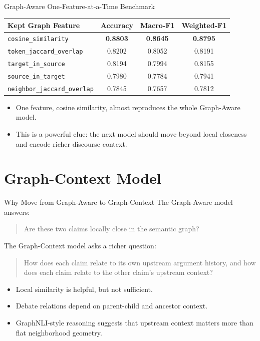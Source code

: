 \documentclass[aspectratio=169, 10pt]{beamer}
\begin{document}
\begin{frame}{Graph-Aware One-Feature-at-a-Time Benchmark}
\begin{center}
\begin{tabular}{lccc}
\toprule
Kept Graph Feature & Accuracy & Macro-F1 & Weighted-F1 \\
\midrule
\texttt{cosine\_similarity} & \textbf{0.8803} & \textbf{0.8645} & \textbf{0.8795} \\
\texttt{token\_jaccard\_overlap} & 0.8202 & 0.8052 & 0.8191 \\
\texttt{target\_in\_source} & 0.8194 & 0.7994 & 0.8155 \\
\texttt{source\_in\_target} & 0.7980 & 0.7784 & 0.7941 \\
\texttt{neighbor\_jaccard\_overlap} & 0.7845 & 0.7657 & 0.7812 \\
\bottomrule
\end{tabular}
\end{center}

\begin{itemize}
  \item One feature, cosine similarity, almost reproduces the whole Graph-Aware model.
  \item This is a powerful clue: the next model should move beyond local closeness and encode richer discourse context.
\end{itemize}
\end{frame}

\section{Graph-Context Model}

\begin{frame}{Why Move from Graph-Aware to Graph-Context}
The Graph-Aware model answers:
\begin{quote}
Are these two claims locally close in the semantic graph?
\end{quote}

The Graph-Context model asks a richer question:
\begin{quote}
How does each claim relate to its own upstream argument history, and how does each claim relate to the other claim's upstream context?
\end{quote}

\begin{itemize}
  \item Local similarity is helpful, but not sufficient.
  \item Debate relations depend on parent-child and ancestor context.
  \item GraphNLI-style reasoning suggests that upstream context matters more than flat neighborhood geometry.
\end{itemize}
\end{frame}
\end{document}
